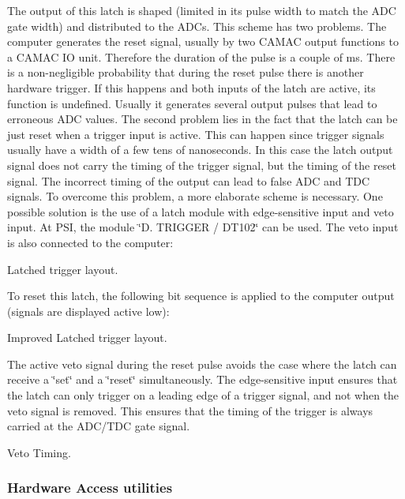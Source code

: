 The output of this latch is shaped (limited in its pulse width to match the ADC gate width) and distributed to the ADCs. This scheme has two problems. The computer generates the reset signal, usually by two CAMAC output functions to a CAMAC IO unit. Therefore the duration of the pulse is a couple of ms. There is a non-\/negligible probability that during the reset pulse there is another hardware trigger. If this happens and both inputs of the latch are active, its function is undefined. Usually it generates several output pulses that lead to erroneous ADC values. The second problem lies in the fact that the latch can be just reset when a trigger input is active. This can happen since trigger signals usually have a width of a few tens of nanoseconds. In this case the latch output signal does not carry the timing of the trigger signal, but the timing of the reset signal. The incorrect timing of the output can lead to false ADC and TDC signals. To overcome this problem, a more elaborate scheme is necessary. One possible solution is the use of a latch module with edge-\/sensitive input and veto input. At PSI, the module \char`\"{}D. TRIGGER / DT102\char`\"{} can be used. The veto input is also connected to the computer:

\begin{center} Latched trigger layout.  \end{center} 

To reset this latch, the following bit sequence is applied to the computer output (signals are displayed active low):

\begin{center} Improved Latched trigger layout.  \end{center} 

The active veto signal during the reset pulse avoids the case where the latch can receive a \char`\"{}set\char`\"{} and a \char`\"{}reset\char`\"{} simultaneously. The edge-\/sensitive input ensures that the latch can only trigger on a leading edge of a trigger signal, and not when the veto signal is removed. This ensures that the timing of the trigger is always carried at the ADC/TDC gate signal.

\begin{center} Veto Timing.  \end{center} 

\par
 

\par
 \label{index_end}
\hypertarget{index_end}{}
 \subsubsection{Hardware Access utilities}\label{FE_utils}
\par
 

